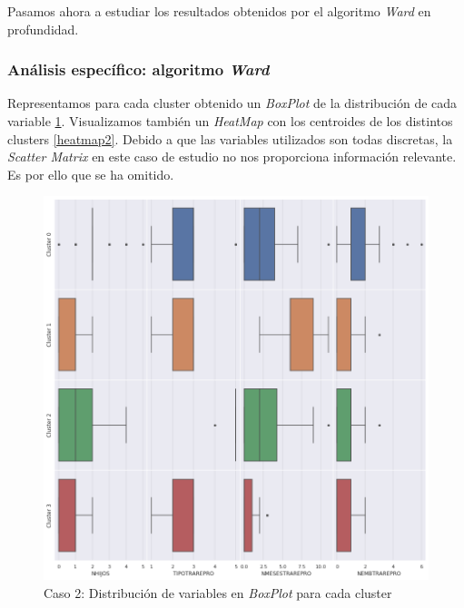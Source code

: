 \documentclass[11pt,a4paper]{article}
\begin{document}
	Pasamos ahora a estudiar los resultados obtenidos por el algoritmo \emph{Ward} en profundidad. 
	
	\subsubsection{Análisis específico: algoritmo \emph{Ward}}
	
	Representamos para cada cluster obtenido un \emph{BoxPlot} de la distribución de cada variable \ref{boxes2}. Visualizamos también un \emph{HeatMap} con los centroides de los distintos clusters \ref{heatmap2}. Debido a que las variables utilizados son todas discretas, la \emph{Scatter Matrix} en este caso de estudio no nos proporciona información relevante. Es por ello que se ha omitido. \\
	
	\begin{figure}[] 
		\centering
		\includegraphics[scale=0.3]{../Caso2/boxes}
		\caption{Caso 2: Distribución de variables en \emph{BoxPlot} para cada cluster} \label{boxes2}
	\end{figure}
	
\end{document}
